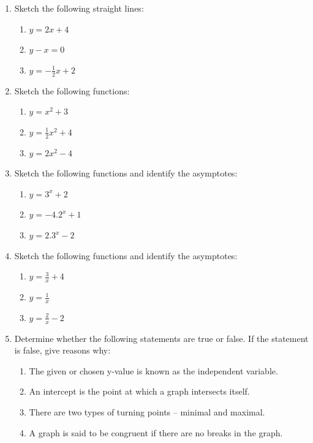 \begin{eocexercises}{}
\nopagebreak
\begin{enumerate}[noitemsep, label=\textbf{\arabic*}. ] 
\item Sketch the following straight lines: 
    \begin{enumerate}[noitemsep, label=\textbf{\alph*}. ] 
    \item $y=2x+4$ 
    \item $y-x=0$ 
    \item $y=-\frac{1}{2}x+2$
    \end{enumerate}
\item Sketch the following functions: 
    \begin{enumerate}[noitemsep, label=\textbf{\alph*}. ] 
    \item $y={x}^{2}+3$ 
    \item $y=\frac{1}{2}{x}^{2}+4$
    \item $y=2{x}^{2}-4$
    \end{enumerate}
\item Sketch the following functions and identify the asymptotes: 
    \begin{enumerate}[noitemsep, label=\textbf{\alph*}. ] 
    \item $y={3}^{x}+2$ 
    \item $y=-4.{2}^{x}+1$ 
    \item $y=2.{3}^{x}-2$ 
    \end{enumerate}
\item Sketch the following functions and identify the asymptotes: 
    \begin{enumerate}[noitemsep, label=\textbf{\alph*}. ] 
    \item $y=\frac{3}{x}+4$ 
    \item $y=\frac{1}{x}$ 
    \item $y=\frac{2}{x}-2$ 
    \end{enumerate}
\item Determine whether the following statements are true or false. If the statement is false, give reasons why:
    \begin{enumerate}[noitemsep, label=\textbf{\alph*}. ] 
    \item The given or chosen y-value is known as the independent variable.
    \item An intercept is the point at which a graph intersects itself.
    \item There are two types of turning points -- minimal and maximal.
    \item A graph is said to be congruent if there are no breaks in the graph.

\end{enumerate}
\end{enumerate}
\end{eocexercises}
